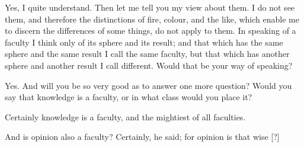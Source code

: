 Yes, I quite understand.
Then let me tell you my view about them. I do not see them, and therefore the distinctions of fire, colour, and the like, which enable me to discern the differences of some things, do not apply to them. In speaking of a faculty I think only of its sphere and its result; and that which has the same sphere and the same result I call the same faculty, but that which has another sphere and another result I call different. Would that be your way of speaking?

Yes.
And will you be so very good as to answer one more question? Would you say that knowledge is a faculty, or in what class would you place it?

Certainly knowledge is a faculty, and the mightiest of all faculties.

And is opinion also a faculty?
Certainly, he said; for opinion is that wise [?]